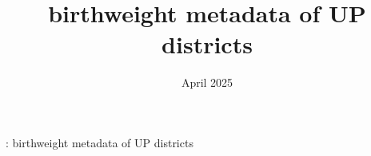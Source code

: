 \documentclass{article}
\title{birthweight metadata of UP districts}
\date{April 2025}
\begin{document}
\begin{table}[H]
    \centering
    \footnotesize %
    \caption{: birthweight metadata of UP districts}
    \label{tab:sumstat}
\end{table}
\end{document}
